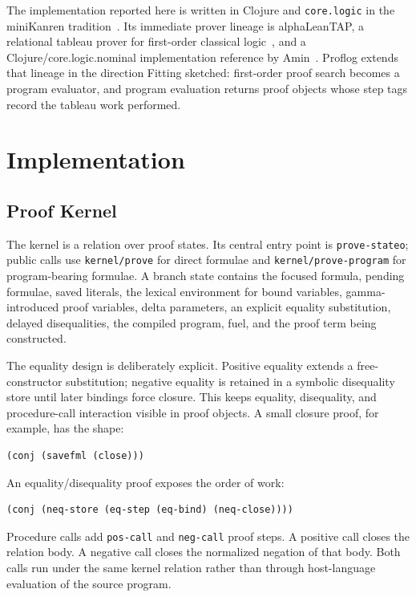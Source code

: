 \documentclass[acmsmall,screen,review,anonymous]{acmart}
\begin{document}
The implementation reported here is written in Clojure and \texttt{core.logic}
in the miniKanren tradition~\cite{byrd2009relational,corelogic}.  Its immediate
prover lineage is alphaLeanTAP, a relational tableau prover for first-order
classical logic~\cite{near2008alphaleantap}, and a Clojure/core.logic.nominal
implementation reference by Amin~\cite{aminLeantap}.  Proflog extends that
lineage in the direction Fitting sketched: first-order proof search becomes a
program evaluator, and program evaluation returns proof objects whose step tags
record the tableau work performed.

\section{Implementation}

\subsection{Proof Kernel}

The kernel is a relation over proof states.  Its central entry point is
\texttt{prove-stateo}; public calls use \texttt{kernel/prove} for direct
formulae and \texttt{kernel/prove-program} for program-bearing formulae.  A
branch state contains the focused formula, pending formulae, saved literals,
the lexical environment for bound variables, gamma-introduced proof variables,
delta parameters, an explicit equality substitution, delayed disequalities, the
compiled program, fuel, and the proof term being constructed.

The equality design is deliberately explicit.  Positive equality extends a
free-constructor substitution; negative equality is retained in a symbolic
disequality store until later bindings force closure.  This keeps equality,
disequality, and procedure-call interaction visible in proof objects.  A small
closure proof, for example, has the shape:

\begin{verbatim}
(conj (savefml (close)))
\end{verbatim}

An equality/disequality proof exposes the order of work:

\begin{verbatim}
(conj (neq-store (eq-step (eq-bind) (neq-close))))
\end{verbatim}

Procedure calls add \texttt{pos-call} and \texttt{neg-call} proof steps.  A
positive call closes the relation body.  A negative call closes the normalized
negation of that body.  Both calls run under the same kernel relation rather
than through host-language evaluation of the source program.
\end{document}
